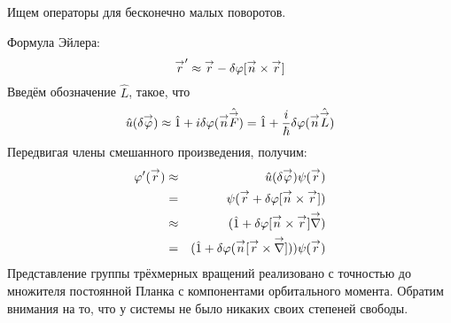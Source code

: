 \subsection{}
Ищем \infze операторы для бесконечно малых поворотов.

Формула Эйлера:
$$
    \overset{\to}{r}' \approx \overset{\to}{r} - \delta \varphi [\overset{\to}{n} \times \overset{\to}{r}]
$$
Введём обозначение $\hat L$, такое, что
$$
    \hat u(\delta \overset{\to}{\varphi}) \approx \hat 1 + i \delta \varphi(\overset{\to}{n} \Hat{\overset{\to}{F}}) =
    \hat 1 + \dfrac{i}{\hbar} \delta \varphi(\overset{\to}{n} \Hat{\overset{\to}{L}})
$$
Передвигая члены смешанного произведения, получим:
\begin{eqnarray*}
    \varphi' (\overset{\to}{r}) &\approx& \hat u(\delta \overset{\to}{\varphi}) \psi(\overset{\to}{r})\\
    &=& \psi(\overset{\to}{r} + \delta \varphi[\overset{\to}{n} \times \overset{\to}{r}])\\
    &\approx& (\hat 1 + \delta \varphi[\overset{\to}{n} \times \overset{\to}{r}] \overset{\to}{\nabla})\\
    &=& (\Hat 1 + \delta \varphi (\overset{\to}{n}[\overset{\to}{r} \times \overset{\to}{\nabla}])) \psi(\overset{\to}{r})
\end{eqnarray*}
Представление группы трёхмерных вращений реализовано с точностью до множителя постоянной Планка с компонентами орбитального момента. Обратим внимания на то, что у системы не было никаких своих степеней свободы.